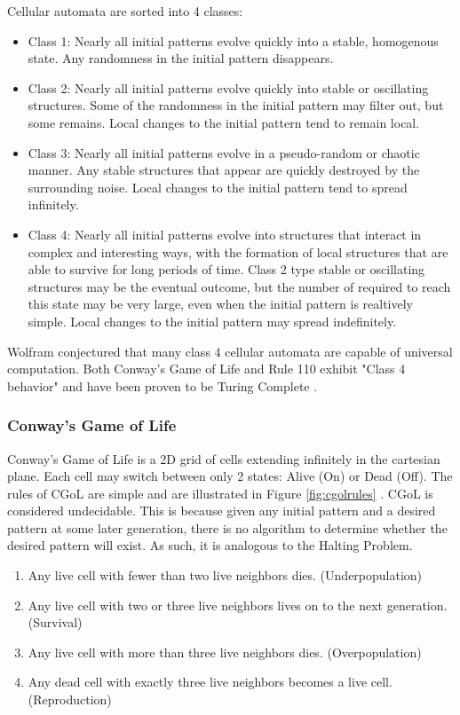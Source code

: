 Cellular automata are sorted into 4 classes:
\begin{itemize}
    \item Class 1: Nearly all initial patterns evolve quickly into a stable, homogenous state.
    Any randomness in the initial pattern disappears.
    \item Class 2: Nearly all initial patterns evolve quickly into stable or oscillating structures.
    Some of the randomness in the initial pattern may filter out, but some remains.
    Local changes to the initial pattern tend to remain local.
    \item Class 3: Nearly all initial patterns evolve in a pseudo-random or chaotic manner.
    Any stable structures that appear are quickly destroyed by the surrounding noise.
    Local changes to the initial pattern tend to spread infinitely.
    \item Class 4: Nearly all initial patterns evolve into structures that interact in complex and interesting ways, with the formation of local structures that are able to survive for long periods of time.
    Class 2 type stable or oscillating structures may be the eventual outcome, but the number of required to reach this state may be very large, even when the initial pattern is realtively simple.
    Local changes to the initial pattern may spread indefinitely.
\end{itemize}

Wolfram conjectured that many class 4 cellular automata are capable of universal computation.
Both Conway's Game of Life and Rule 110 exhibit "Class 4 behavior" and have been proven to be Turing Complete \cite{CGoLTM,CellAutBook}.

\subsubsection{Conway's Game of Life}\label{subsubsec:CGoL}

Conway's Game of Life is a 2D grid of cells extending infinitely in the cartesian plane.
Each cell may switch between only 2 states: Alive (On) or Dead (Off).
The rules of CGoL are simple and are illustrated in Figure \ref{fig:cgolrules} \cite{CGoLImg}.
CGoL is considered undecidable.
This is because given any initial pattern and a desired pattern at some later generation, there is no algorithm to determine whether the desired pattern will exist.
As such, it is analogous to the Halting Problem.

\begin{enumerate}
    \item Any live cell with fewer than two live neighbors dies. (Underpopulation)
    \item Any live cell with two or three live neighbors lives on to the next generation. (Survival)
    \item Any live cell with more than three live neighbors dies. (Overpopulation)
    \item Any dead cell with exactly three live neighbors becomes a live cell. (Reproduction)
\end{enumerate}

